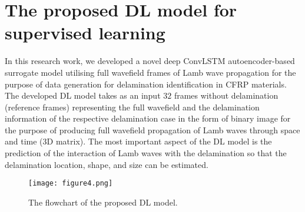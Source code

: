 \section{The proposed DL model for supervised learning}
\label{sec:proposed_approach}
In this research work, we developed a novel deep ConvLSTM autoencoder-based surrogate model utilising full wavefield frames of Lamb wave propagation for the purpose of data generation for delamination identification in CFRP materials.
The developed DL model takes as an input \(32\) frames without delamination (reference frames) representing the full wavefield and the delamination information of the respective delamination case in the form of binary image for the purpose of producing full wavefield propagation of Lamb waves through space and time (3D matrix).
The most important aspect of the DL model is the prediction of the interaction of Lamb waves with the delamination so that the delamination location, shape, and size can be estimated.
\begin{figure} [h!]
	\begin{center}
		\texttt{[image: figure4.png]}
	\end{center}
	\caption{The flowchart of the proposed DL model.} 
	\label{fig:proposed_model}
\end{figure}

